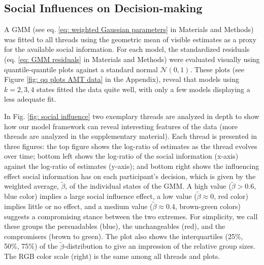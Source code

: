 \documentclass[9pt,twocolumn,twoside,lineno]{pnas-new}
\begin{document}
\subsection*{Social Influences on Decision-making} 
A GMM (see eq. \ref{eq: weighted Gaussian parameters} in Materials and Methods) was fitted to all threads using the geometric mean of visible estimates as a proxy for the available social information. For each model, the standardized residuals (eq. \ref{eq: GMM residuals} in Materials and Methods) were evaluated visually using quantile-quantile plots against a standard normal $\mathcal{N}(0,1)$. These plots (see Figure \ref{fig: qq plots AMT data} in the Appendix), reveal that models using $k=2,3,4$ states fitted the data quite well, with only a few models displaying a less adequate fit. 


In Fig. \ref{fig: social influence} two exemplary threads are analyzed in depth to show how our model framework can reveal interesting features of the data (more threads are analyzed in the supplementary material). Each thread is presented in three figures: the top figure shows the log-ratio of estimates as the thread evolves over time; bottom left shows the log-ratio of the social information (x-axis) against the log-ratio of estimates (y-axis); and bottom right shows the influencing effect social information has on each participant's decision, which is given by the weighted average, $\tilde{\beta}$, of the individual states of the GMM. A high value ($\tilde{\beta}>0.6$, blue color) implies a large social influence effect, a low value ($\tilde{\beta}\approx 0$, red color) implies little or no effect, and a medium value ($\tilde{\beta} \approx 0.4$, brown-green colors) suggests a compromising stance between the two extremes. For simplicity, we call these groups the persuadables (blue), the unchangeables (red), and the compromisers (brown to green). The plot also shows the interquartiles (25\%, 50\%, 75\%) of the $\tilde{\beta}$-distribution to give an impression of the relative group sizes. The RGB color scale (right) is the same among all threads and plots. 
\end{document}

